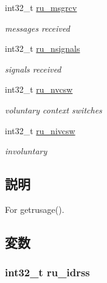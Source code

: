 \begin{DoxyCompactItemize}
int32\_\-t \hyperlink{structArmLinux32_1_1rusage_a822f1d71baf8918c434f886b16d08cb6}{ru\_\-msgrcv}
\begin{DoxyCompactList}\small\item\em messages received \item\end{DoxyCompactList}\item 
int32\_\-t \hyperlink{structArmLinux32_1_1rusage_a51e45aa5be7be675e1621a8970fa948b}{ru\_\-nsignals}
\begin{DoxyCompactList}\small\item\em signals received \item\end{DoxyCompactList}\item 
int32\_\-t \hyperlink{structArmLinux32_1_1rusage_a4e4a95ffb77259342e5f01dba936ff65}{ru\_\-nvcsw}
\begin{DoxyCompactList}\small\item\em voluntary context switches \item\end{DoxyCompactList}\item 
int32\_\-t \hyperlink{structArmLinux32_1_1rusage_a5e1eb51c89d5fa193b6da2ea9402ae85}{ru\_\-nivcsw}
\begin{DoxyCompactList}\small\item\em involuntary  \item\end{DoxyCompactList}\end{DoxyCompactItemize}


\subsection{説明}
For getrusage(). 

\subsection{変数}
\hypertarget{structArmLinux32_1_1rusage_a9f8fc791df741d64411fa8aea728e7cf}{
\subsubsection[{ru\_\-idrss}]{\setlength{\rightskip}{0pt plus 5cm}int32\_\-t {\bf ru\_\-idrss}}}
\label{structArmLinux32_1_1rusage_a9f8fc791df741d64411fa8aea728e7cf}


